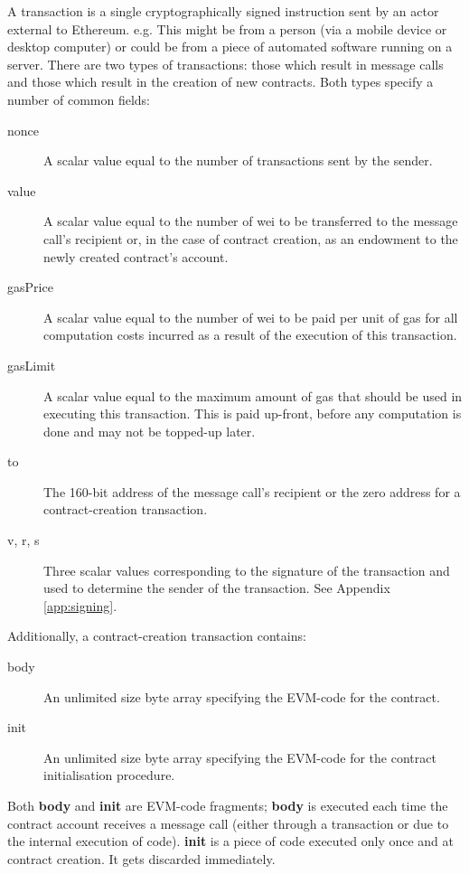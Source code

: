 \documentclass[9pt,oneside]{amsart}
\begin{document}
\begin{multicols}{2}
A transaction is a single cryptographically signed instruction sent by an actor external to Ethereum. e.g. This might be from a person (via a mobile device or desktop computer) or could be from a piece of automated software running on a server. There are two types of transactions: those which result in message calls and those which result in the creation of new contracts. Both types specify a number of common fields:

\begin{description}
\item[nonce] A scalar value equal to the number of transactions sent by the sender.
\item[value] A scalar value equal to the number of wei to be transferred to the message call's recipient or, in the case of contract creation, as an endowment to the newly created contract's account.
\item[gasPrice] A scalar value equal to the number of wei to be paid per unit of gas for all computation costs incurred as a result of the execution of this transaction.
\item[gasLimit] A scalar value equal to the maximum amount of gas that should be used in executing this transaction. This is paid up-front, before any computation is done and may not be topped-up later.
\item[to] The 160-bit address of the message call's recipient or the zero address for a contract-creation transaction.
\item[v, r, s] Three scalar values corresponding to the signature of the transaction and used to determine the sender of the transaction. See Appendix \ref{app:signing}.
\end{description}

Additionally, a contract-creation transaction contains:

\begin{description}
\item[body] An unlimited size byte array specifying the EVM-code for the contract.
\item[init] An unlimited size byte array specifying the EVM-code for the contract initialisation procedure.
\end{description}

Both \textbf{body} and \textbf{init} are EVM-code fragments; \textbf{body} is executed each time the contract account receives a message call (either through a transaction or due to the internal execution of code). \textbf{init} is a piece of code executed only once and at contract creation. It gets discarded immediately.


\end{multicols}
\end{document}
